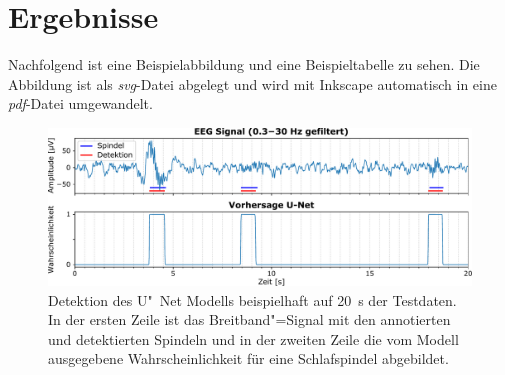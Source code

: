 \chapter{Ergebnisse} \label{sec:results}

Nachfolgend ist eine Beispielabbildung und eine Beispieltabelle zu sehen.
Die Abbildung ist als \textit{svg}-Datei abgelegt und wird mit Inkscape automatisch in eine \textit{pdf}-Datei umgewandelt.

\begin{figure}
	\centering
	\includegraphics[width=\linewidth]{images/spindle-detection-u-net_svg-raw}
	\caption{
		Detektion des U"~Net Modells beispielhaft auf \SI{20}{\s} der Testdaten.
		In der ersten Zeile ist das Breitband"=Signal mit den annotierten und detektierten Spindeln und in der zweiten Zeile die vom Modell ausgegebene Wahrscheinlichkeit für eine Schlafspindel abgebildet.
	}
	\label{fig:results:spindle-detection-u-net}
\end{figure}

